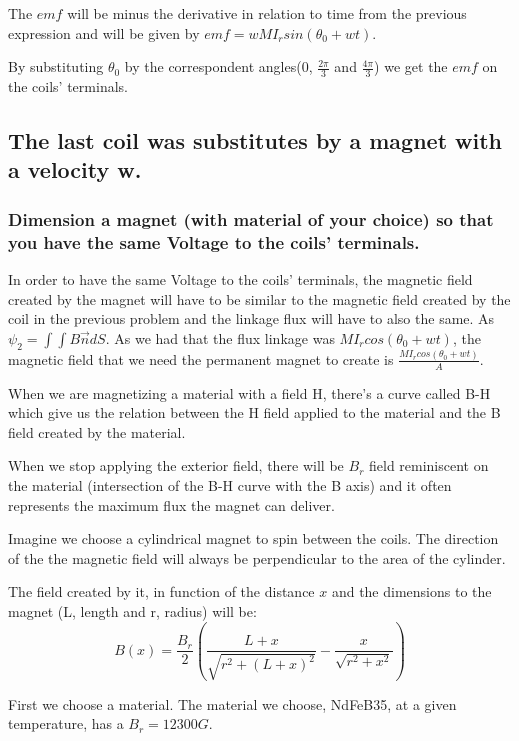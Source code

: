 \documentclass[a4paper,12pt]{article}
\begin{document}
The $emf$ will be minus the derivative in relation to time from the previous expression and will be given by $emf = wMI_rsin(\theta_0 + wt)$.


By substituting $\theta_0$ by the correspondent angles(0, $\frac{2\pi}{3}$ and $\frac{4\pi}{3}$) we get the $emf$ on the coils' terminals.


 \subsection{The last coil was substitutes by a magnet with a velocity w.}
\subsubsection{Dimension a magnet (with material of your choice) so that you have the same Voltage to the coils' terminals.}
\hspace{1cm} In order to have the same Voltage to the coils' terminals, the magnetic field created by the magnet will have to be similar to the magnetic field created by the coil in the previous problem and the linkage flux will have to also the same. As $\psi_2 = \int \int B\vec{n}dS$. As we had that the flux linkage was $MI_rcos(\theta_0 + wt)$, the magnetic field that we need the permanent magnet to create is $\frac{MI_rcos(\theta_0 + wt)}{A}$.

When we are magnetizing a material with a field H, there's a curve called B-H which give us the relation between the H field applied to the material and the B field created by the material. 

When we stop applying the exterior field, there will be $B_r$ field reminiscent on the material (intersection of the B-H curve with the B axis) and it often represents the maximum flux the magnet can deliver. 

Imagine we choose a cylindrical magnet to spin between the coils. The direction of the the magnetic field will always be perpendicular to the area of the cylinder. 

The field created by it, in function of the distance $x$ and the dimensions to the magnet (L, length and r, radius) will be:
\begin{equation}
B(x) = \frac{B_r}{2}\left ( \frac{L+x}{\sqrt{r^2+(L+x)^2}}-\frac{x}{\sqrt{r^2+x^2}} \right )
\end{equation}

First we choose a material. The material we choose, NdFeB35, at a given temperature, has a $B_r = 12300 G$.
\end{document}
